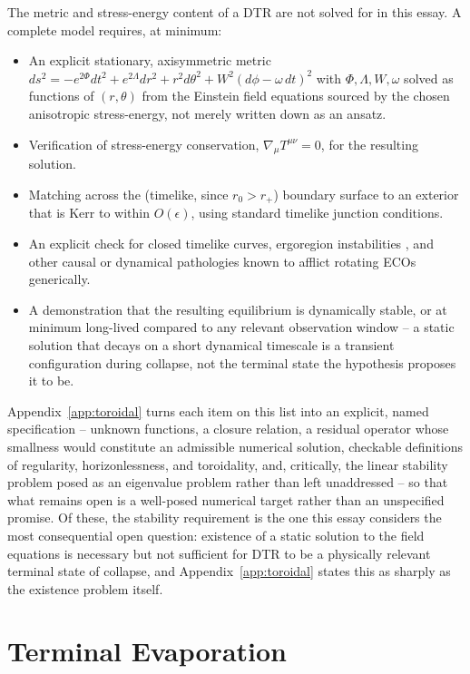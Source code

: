 \documentclass[11pt]{article}
\begin{document}
The metric and stress-energy content of a DTR are not solved for in this essay. A complete model requires, at minimum:
\begin{itemize}
\item An explicit stationary, axisymmetric metric $ds^2 = -e^{2\Phi}dt^2 + e^{2\Lambda}dr^2 + r^2 d\theta^2 + W^2(d\phi-\omega\, dt)^2$ with $\Phi,\Lambda,W,\omega$ solved as functions of $(r,\theta)$ from the Einstein field equations sourced by the chosen anisotropic stress-energy, not merely written down as an ansatz.
\item Verification of stress-energy conservation, $\nabla_\mu T^{\mu\nu} = 0$, for the resulting solution.
\item Matching across the (timelike, since $r_0 > r_+$) boundary surface to an exterior that is Kerr to within $O(\epsilon)$, using standard timelike junction conditions.
\item An explicit check for closed timelike curves, ergoregion instabilities \cite{cardosopani2019}, and other causal or dynamical pathologies known to afflict rotating ECOs generically.
\item A demonstration that the resulting equilibrium is dynamically stable, or at minimum long-lived compared to any relevant observation window -- a static solution that decays on a short dynamical timescale is a transient configuration during collapse, not the terminal state the hypothesis proposes it to be.
\end{itemize}
Appendix~\ref{app:toroidal} turns each item on this list into an explicit, named specification -- unknown functions, a closure relation, a residual operator whose smallness would constitute an admissible numerical solution, checkable definitions of regularity, horizonlessness, and toroidality, and, critically, the linear stability problem posed as an eigenvalue problem rather than left unaddressed -- so that what remains open is a well-posed numerical target rather than an unspecified promise. Of these, the stability requirement is the one this essay considers the most consequential open question: existence of a static solution to the field equations is necessary but not sufficient for DTR to be a physically relevant terminal state of collapse, and Appendix~\ref{app:toroidal} states this as sharply as the existence problem itself.

\section{Terminal Evaporation}
\end{document}
